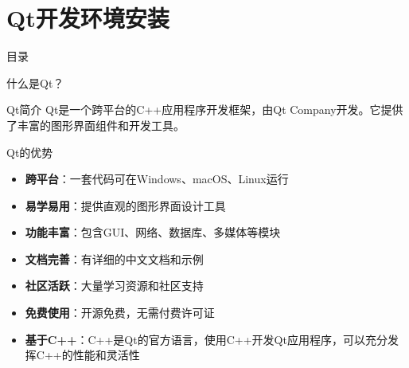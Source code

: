 \documentclass[UTF8,aspectratio=169]{beamer}
\begin{document}
\section{Qt开发环境安装}
\begin{frame}{目录}
    \begin{multicols}{2}
        \tableofcontents[currentsection]
    \end{multicols}
\end{frame}

\begin{frame}{什么是Qt？}
    \begin{ytublock}{Qt简介}
        Qt是一个跨平台的C++应用程序开发框架，由Qt Company开发。它提供了丰富的图形界面组件和开发工具。
    \end{ytublock}

    \begin{ytublock}{Qt的优势}
        \begin{itemize}
            \item \textbf{跨平台}：一套代码可在Windows、macOS、Linux运行
            \item \textbf{易学易用}：提供直观的图形界面设计工具
            \item \textbf{功能丰富}：包含GUI、网络、数据库、多媒体等模块
            \item \textbf{文档完善}：有详细的中文文档和示例
            \item \textbf{社区活跃}：大量学习资源和社区支持
            \item \textbf{免费使用}：开源免费，无需付费许可证
            \item \textbf{基于C++}：C++是Qt的官方语言，使用C++开发Qt应用程序，可以充分发挥C++的性能和灵活性
        \end{itemize}
    \end{ytublock}
\end{frame}
\end{document}
